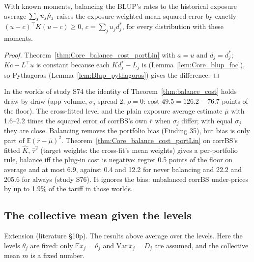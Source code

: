 \begin{theorem}\label{thm:Core_balance_blup_cost}
  \leanok
  With known moments, balancing the BLUP's rates to the historical exposure average
  $\sum_j u_j\hat\mu_j$ raises the exposure-weighted mean squared error by exactly
  $(u - c)^\top K(u - c) \ge 0$, $c = \sum_j u_jd^*_j$, for every distribution with these moments.
\end{theorem}
\begin{proof}
  \leanok
  Theorem~\ref{thm:Core_balance_cost_portLin} with $a = u$ and $d_j = d^*_j$; $Kc - L^\top u$ is
  constant because each $Kd^*_j - L_j$ is (Lemma~\ref{lem:Core_blup_foc}), so Pythagoras
  (Lemma~\ref{lem:Blup_pythagoras}) gives the difference.
\end{proof}

\begin{remark}
  In the worlds of study S74 the identity of Theorem~\ref{thm:balance_cost} holds draw by draw
  (app volume, $\sigma_j$ spread 2, $\rho = 0$: cost $49.5 = 126.2 - 76.7$ points of the floor). The
  cross-fitted level and the plain exposure average estimate $\bar\mu$ with 1.6--2.2 times the
  squared error of corrBS's own $\bar r$ when $\sigma_j$ differ; with equal $\sigma_j$ they are close.
  Balancing removes the portfolio bias (Finding 35), but bias is only part of
  $\mathbb E(\bar r - \bar\mu)^2$. Theorem~\ref{thm:Core_balance_cost_portLin} on corrBS's fitted
  $\hat K$, $\hat\tau^2$ (target weights: the cross-fit's mean weights) gives a per-portfolio rule,
  balance iff the plug-in cost is negative: regret 0.5 points of the floor on average and at most 6.9,
  against 0.4 and 12.2 for never balancing and 22.2 and 205.6 for always (study S76). It ignores the
  bias: unbalanced corrBS under-prices by up to 1.9\% of the tariff in those worlds.
\end{remark}

\subsection*{The collective mean given the levels}

Extension (literature \S10p). The results above average over the levels. Here the levels
$\theta_j$ are fixed: only $\mathbb E\bar x_j = \theta_j$ and $\mathrm{Var}\,\bar x_j = D_j$
are assumed, and the collective mean $m$ is a fixed number.

